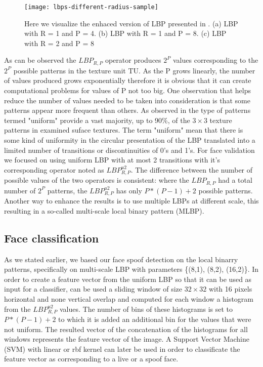 \begin{figure}[h]
	\begin{center}
		\texttt{[image: lbps-different-radius-sample]}
	\end{center}
	\caption[Enhanced LBP visualisation]{Here we visualize the enhaced version of LBP presented in \cite{OjalaPM02}. (a) LBP with R = 1 and P = 4. (b) LBP with R = 1 and P = 8. (c) LBP with R = 2 and P = 8}
\end{figure}
As can be observed the $LBP_{R,P}$ operator produces $2^P$ values corresponding to the $2^P$ possible patterns in the texture unit TU. As the P grows linearly, the number of values produced grows exponentially therefore it is obvious that it can create computational problems for values of P not too big. 
One observation that helps reduce the number of values needed to be taken into consideration is that some patterns appear more frequent than others. As observed in \cite{OjalaPM02} the type of patterns termed "uniform" provide a vast majority, up to 90\%, of the $3\times3$ texture patterns in examined suface textures. The term "uniform" mean that there is some kind of uniformity in the circular presentation of the LBP translated into a limited number of transitions or discontinuities of 0's and 1's. For face validation we focused on using uniform LBP with at most 2 transitions with it's corresponding operator noted as $LBP_{R,P}^{u2}$. The difference between the number of possible values of the two operators is consistent: where the $LBP_{R,P}$ had a total number of $2^P$ patterns, the $LBP_{R,P}^{u2}$ has only $P*(P-1)+2$ possible patterns.
Another way to enhance the results is to use multiple LBPs at different scale, this resulting in a so-called multi-scale local binary pattern (MLBP).

\subsection{Face classification}
As we stated earlier, we based our face spoof detection on the local binarry patterns, specifically on multi-scale LBP with parameters \{(8,1), (8,2), (16,2)\}. In order to create a feature vector from the uniform LBP so that it can be used as input for a classifier, can be used a sliding window of size $32\times32$ with 16 pixels horizontal and none vertical overlap and computed for each window a histogram from the $LBP_{R,P}^{u2}$ values. The number of bins of these histograms is set to $P*(P-1) + 2$ to which it is added an additional bin for the values that were not uniform. The resulted vector of the concatenation of the histograms for all windows represents the feature vector of the image. A Support Vector Machine (SVM) with linear or rbf kernel can later be used in order to classificate the feature vector as corresponding to a live or a spoof face.

